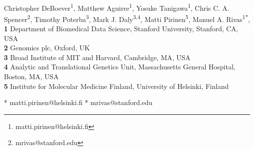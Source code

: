 
\usepackage{float}

\newcommand{\lorem}{{\bf LOREM}}
\newcommand{\ipsum}{{\bf IPSUM}}

\def\bs{\boldsymbol}
\def\Vy{\widehat{\textrm{V}}_Y}




\begin{flushleft}
{\Large
\textbf{} %
}
\newline
\\
\author{Christopher DeBoever$^{1}$, Matthew Aguirre$^{1}$, Yosuke Tanigawa$^{1}$, Chris C. A. Spencer$^{2}$, Timothy Poterba$^{3}$, Mark J. Daly$^{4,5}$,  Matti Pirinen$^{5}$\thanks{matti.pirinen@helsinki.fi}, and Manuel A. Rivas$^{1}$\thanks{mrivas@stanford.edu}}
Christopher DeBoever\textsuperscript{1},
Matthew Aguirre\textsuperscript{1},
Yosuke Tanigawa\textsuperscript{1},
Chris C. A. Spencer\textsuperscript{2},
Timothy Poterba\textsuperscript{3},
Mark J. Daly\textsuperscript{3,4},
Matti Pirinen\textsuperscript{5},
Manuel A. Rivas\textsuperscript{1*},
\\
\bigskip
\textbf{1} Department of Biomedical Data Science, Stanford University, Stanford, CA, USA
\\
\textbf{2} Genomics plc, Oxford, UK
\\
\textbf{3} Broad Institute of MIT and Harvard, Cambridge, MA, USA
\\
\textbf{4} Analytic and Translational Genetics Unit, Massachusetts General Hospital, Boston, MA, USA
\\
\textbf{5} Institute for Molecular Medicine Finland, University of Helsinki, Finland
\\
\bigskip

* matti.pirinen@helsinki.fi
\newline
* mrivas@stanford.edu

\end{flushleft}
